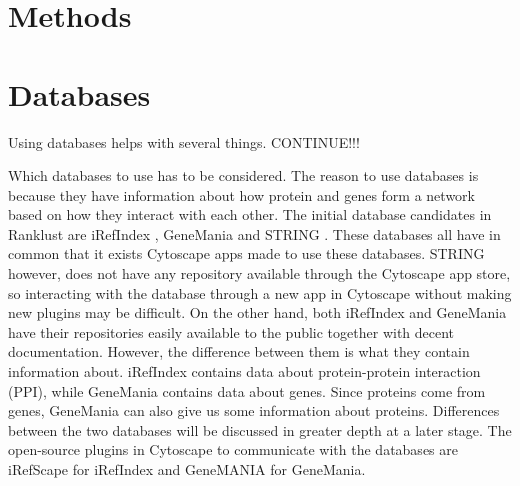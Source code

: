 \documentclass[UKenglish]{ifimaster}
\begin{document}

\chapter{Methods}

\chapter{Databases}
Using databases helps with several things. CONTINUE!!!

Which databases to use has to be considered. The reason to use databases is
because they have information about how protein and genes form a network based
on how they interact with each other. The initial database candidates in
Ranklust are iRefIndex \cite{iri}, GeneMania \cite{gm} and STRING \cite{str}.
These databases all have in common that it exists Cytoscape apps made to use
these databases. STRING however, does not have any repository available through
the Cytoscape app store, so interacting with the database through a new app in
Cytoscape without making new plugins may be difficult.  On the other hand, both
iRefIndex and GeneMania have their repositories easily available to the public
together with decent documentation. However, the difference between them is what
they contain information about. iRefIndex contains data about protein-protein
interaction (PPI), while GeneMania contains data about genes.
Since proteins come from genes, GeneMania can also give us some information
about proteins. Differences between the two databases will be discussed in
greater depth at a later stage.  The open-source plugins in Cytoscape to
communicate with the databases are iRefScape \cite{iridb} for iRefIndex and
GeneMANIA \cite{gmdb} for GeneMania.
\end{document}
